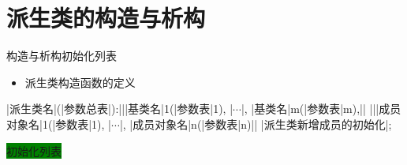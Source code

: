 \section[构造与析构]{派生类的构造与析构}\label{sec:chap05-sec03}
\begin{frame}[t, fragile]{构造与析构}{初始化列表}%
  \begin{spacing}{1.8}
  \begin{itemize}
  \item 派生类构造函数的定义
  \end{itemize}
  \begin{center}
    \begin{minipage}{0.7\linewidth}
      \begin{cpptt}
|派生类名|(|参数总表|):|||基类名|1(|参数表|1), |$\cdots$|, |基类名|m(|参数表|m),||
            |||成员对象名|1(|参数表|1), |$\cdots$|, |成员对象名|n(|参数表|n)||
{
    |派生类新增成员的初始化|;
}
      \end{cpptt}
    \end{minipage}\qquad
    \begin{minipage}{0.15\linewidth}
      \tiny
      \colorbox{green}{初始化列表}
    \end{minipage}
  \end{center}
  \end{spacing}
\end{frame}

